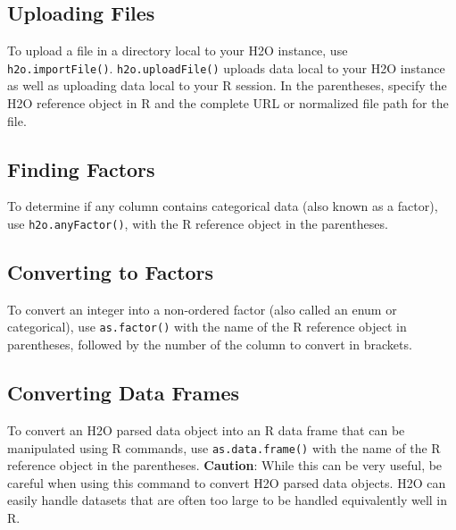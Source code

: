 {{\waterExampleInR
\medskip


\subsection{Uploading Files}

To upload a file in a directory local to your H2O instance, use {\texttt{h2o.importFile()}}.  {\texttt{h2o.uploadFile()}}  uploads data local to your H2O instance as well as uploading data local to your R session. In the parentheses, specify the H2O reference object in R and the complete URL or normalized file path for the file.


\waterExampleInR
\medskip



\subsection{Finding Factors}
To determine if any column contains categorical data (also known as a factor), use {\texttt{h2o.anyFactor()}}, with the R reference object in the parentheses.

\waterExampleInR
\medskip


\subsection{Converting to Factors}
To convert an integer into a non-ordered factor (also called an enum or categorical), use {\texttt{as.factor()}} with the name of the R reference object in parentheses, followed by the number of the column to convert in brackets.

\waterExampleInR
\medskip


\subsection{Converting Data Frames}

To convert an H2O parsed data object into an R data frame that can be manipulated using R commands, use {\texttt{as.data.frame()}} with the name of the R reference object in the parentheses.
{\textbf{Caution}}: While this can be very useful, be careful when using this command to convert H2O parsed data objects. H2O can easily handle datasets that are often too large to be handled equivalently well in R.

}}
